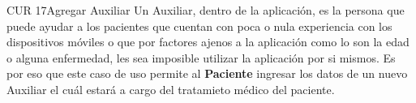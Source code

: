 \begin{UseCase}{CUR 17}{Agregar Auxiliar}
    {
   		Un Auxiliar, dentro de la aplicación, es la persona que puede ayudar a los pacientes que cuentan con poca o nula experiencia con los dispositivos móviles o que por factores ajenos a la aplicación como lo son la edad o alguna enfermedad, les sea imposible utilizar la aplicación por si mismos. Es por eso que este caso de uso permite al \textbf{Paciente} ingresar los datos de un nuevo Auxiliar el cuál estará a cargo del tratamieto médico del paciente.
    }


\end{UseCase}
